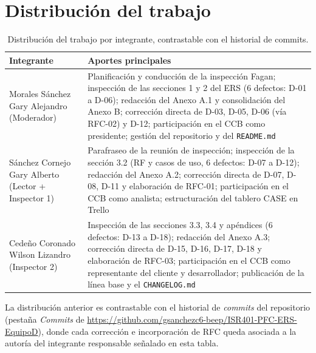 \documentclass[journal,onecolumn]{IEEEtran}
\begin{document}
	\section{Distribución del trabajo}
	\label{sec:distribucion}
	
	\begin{table}[H]
		\centering
		\caption{Distribución del trabajo por integrante, contrastable con el historial de commits.}
		\label{tab:distribucion}
		\small
		\begin{tabularx}{\textwidth}{@{}l X@{}}
			\toprule
			\textbf{Integrante} & \textbf{Aportes principales} \\
			\midrule
			Morales Sánchez Gary Alejandro (Moderador) & Planificación y conducción de la inspección Fagan; inspección de las secciones 1 y 2 del ERS (6 defectos: D-01 a D-06); redacción del Anexo A.1 y consolidación del Anexo B; corrección directa de D-03, D-05, D-06 (vía RFC-02) y D-12; participación en el CCB como presidente; gestión del repositorio y del \texttt{README.md} \\
			\addlinespace
			Sánchez Cornejo Gary Alberto (Lector + Inspector 1) & Parafraseo de la reunión de inspección; inspección de la sección 3.2 (RF y casos de uso, 6 defectos: D-07 a D-12); redacción del Anexo A.2; corrección directa de D-07, D-08, D-11 y elaboración de RFC-01; participación en el CCB como analista; estructuración del tablero CASE en Trello \\
			\addlinespace
			Cedeño Coronado Wilson Lizandro (Inspector 2) & Inspección de las secciones 3.3, 3.4 y apéndices (6 defectos: D-13 a D-18); redacción del Anexo A.3; corrección directa de D-15, D-16, D-17, D-18 y elaboración de RFC-03; participación en el CCB como representante del cliente y desarrollador; publicación de la línea base y el \texttt{CHANGELOG.md} \\
			\bottomrule
		\end{tabularx}
	\end{table}
	
	La distribución anterior es contrastable con el historial de
	\emph{commits} del repositorio (pestaña \emph{Commits} de
	\url{https://github.com/gsanchezc6-beep/ISR401-PFC-ERS-EquipoD}),
	donde cada corrección e incorporación de RFC queda asociada a la
	autoría del integrante responsable señalado en esta tabla.
	
	\printbibliography[title={Referencias}, heading=bibnumbered]
	
\end{document}

